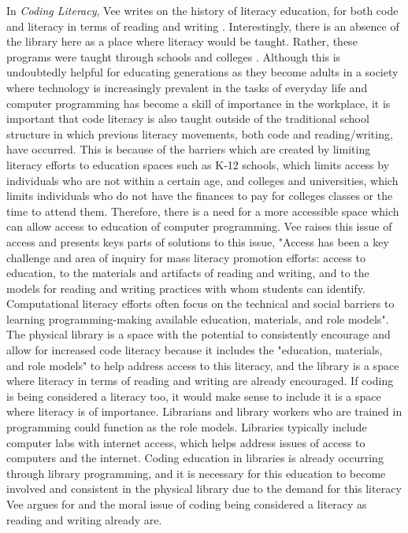 In \textit{Coding Literacy}, Vee writes on the history of literacy education, for both code and literacy in terms of reading and writing \cite{vee2017coding}. Interestingly, there is an absence of the library here as a place where literacy would be taught. Rather, these programs were taught through schools and colleges \cite{vee2017coding}. Although this is undoubtedly helpful for educating generations as they become adults in a society where technology is increasingly prevalent in the tasks of everyday life and computer programming has become a skill of importance in the workplace, it is important that code literacy is also taught outside of the traditional school structure in which previous literacy movements, both code and reading/writing, have occurred. This is because of the barriers which are created by limiting literacy efforts to education spaces such as K-12 schools, which limits access by individuals who are not within a certain age, and colleges and universities, which limits individuals who do not have the finances to pay for colleges classes or the time to attend them. Therefore, there is a need for a more accessible space which can allow access to education of computer programming. Vee raises this issue of access and presents keys parts of solutions to this issue, "Access has been a key challenge and area of inquiry for mass literacy promotion efforts: access to education, to the materials and artifacts of reading and writing, and to the models for reading and writing practices with whom students can identify. Computational literacy efforts often focus on the technical and social barriers to learning programming-making available education, materials, and role models"\cite{vee2017coding}. The physical library is a space with the potential to consistently encourage and allow for increased code literacy because it includes the "education, materials, and role models" to help address access to this literacy, and the library is a space where literacy in terms of reading and writing are already encouraged. If coding is being considered a literacy too, it would make sense to include it is a space where literacy is of importance. Librarians and library workers who are trained in programming could function as the role models. Libraries typically include computer labs with internet access, which helps address issues of access to computers and the internet. Coding education in libraries is already occurring through library programming\cite{harrop2018codinglibrary}, and it is necessary for this education to become involved and consistent in the physical library due to the demand for this literacy Vee argues for and the moral issue of coding being considered a literacy as reading and writing already are. 

